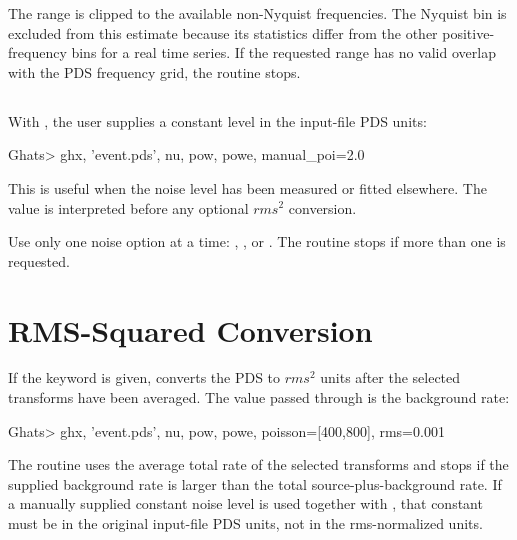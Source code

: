 The range is clipped to the available non-Nyquist frequencies.  The Nyquist
bin is excluded from this estimate because its statistics differ from the
other positive-frequency bins for a real time series.  If the requested range
has no valid overlap with the PDS frequency grid, the routine stops.

\subsection{}

With , the user supplies a constant level in the input-file
PDS units:

\begin{ghatsconsole}
Ghats> ghx, 'event.pds', nu, pow, powe, manual_poi=2.0
\end{ghatsconsole}

This is useful when the noise level has been measured or fitted elsewhere.
The value is interpreted before any optional \(rms^2\) conversion.

\begin{ghatsnote}
Use only one noise option at a time: ,
, or .  The routine stops if
more than one is requested.
\end{ghatsnote}

\section{RMS-Squared Conversion}

If the  keyword is given,  converts the PDS to
\(rms^2\) units after the selected transforms have been averaged.  The value
passed through  is the background rate:

\begin{ghatsconsole}
Ghats> ghx, 'event.pds', nu, pow, powe, poisson=[400,800], rms=0.001
\end{ghatsconsole}

The routine uses the average total rate of the selected transforms and stops
if the supplied background rate is larger than the total source-plus-background
rate.  If a manually supplied constant noise level is used together with
, that constant must be in the original input-file PDS units, not
in the rms-normalized units.

\section{}


